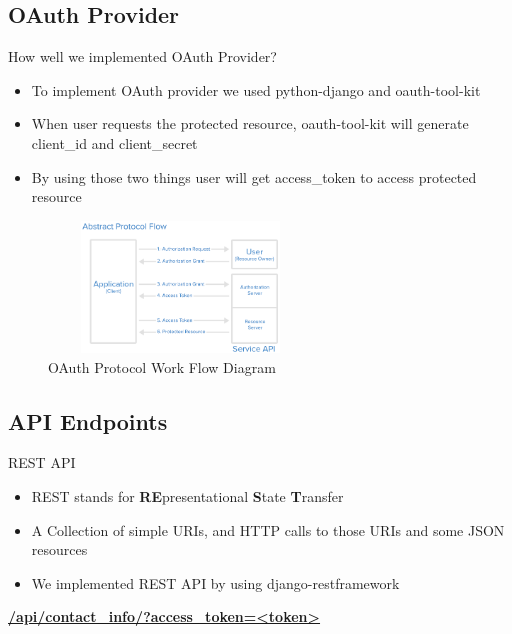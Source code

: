 \documentclass[10pt,xcolor=dvipsnames]{beamer}
\begin{document}
\subsection{OAuth Provider}
\begin{frame}{How well we implemented OAuth Provider?}
	\begin{itemize}
		\item To implement OAuth provider we used python-django and oauth-tool-kit
		\item When user requests the protected resource, oauth-tool-kit will generate client\_id and client\_secret 
		\item By using those two things user will get access\_token to access protected resource
	\end{itemize}
	  
\begin{figure}
\begin{center}
\includegraphics[width=7cm,height=3.5cm]{abstract_flow}
\caption{OAuth Protocol Work Flow Diagram\label{fig:OAuth Protocol Work Flow Diagram}}
\end{center}

\end{figure}
\end{frame}

\subsection{API Endpoints}
\begin{frame}{REST API}
	\begin{itemize}
		\item REST stands for \textbf{RE}presentational \textbf{S}tate \textbf{T}ransfer
		\item A Collection of simple URIs, and HTTP calls to those URIs and some JSON resources
		\item We implemented REST API by using django-restframework
	\end{itemize}
	\textbf{\url{/api/contact_info/?access_token=<token>}}
	
\end{frame}
\end{document}
